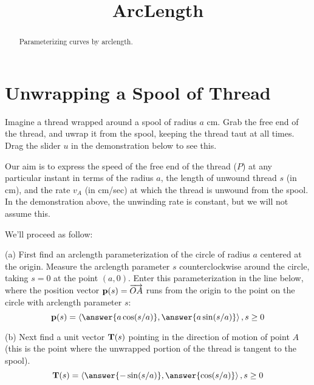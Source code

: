 \documentclass{ximera}
\title{ArcLength}
\begin{document}
\begin{abstract}
Parameterizing curves by arclength. 
\end{abstract}
\maketitle


\section{Unwrapping a Spool of Thread}

\begin{question}  \label{Qgdghubhgfdg}

Imagine a thread wrapped around a spool of radius $a$ cm. Grab the free end of the thread, and uwrap it from the spool, keeping the thread taut at all times. Drag the slider $u$ in the demonstration below to see this.

 
\begin{onlineOnly}
    \begin{center}
\end{center}
\end{onlineOnly}


Our aim is to express the speed of the free end of the thread ($P$) at any particular instant in terms of the radius $a$, the length of unwound thread $s$ (in cm), and the rate $v_A$ (in cm/sec) at which the thread is unwound from the spool. In the demonstration above, the unwinding rate is constant, but we will not assume this. 

We'll proceed as follow:

(a) First find an arclength parameterization of the circle of radius $a$ centered at the origin. Measure the arclength parameter $s$ counterclockwise around the circle, taking $s=0$ at the point $(a,0)$. Enter this parameterization in the line below, where the position vector ${\bf p}(s) = \overrightarrow{OA}$ runs from the origin to the point on the circle with arclength parameter $s$:
\[
    {\bf p}(s) = \langle \answer{a \cos (s/a)} , \answer{a \sin (s/a)}  \rangle \, , s\geq 0 
\]

(b) Next find a unit vector ${\bf T}(s)$ pointing in the direction of motion of point $A$ (this is the point where the unwrapped portion of the thread is tangent to the spool). 
\[
    {\bf T}(s) = \langle \answer{- \sin (s/a)} , \answer{\cos (s/a)}  \rangle \, , s\geq 0
\]


\end{question}
\end{document}

